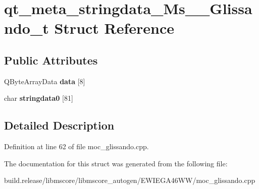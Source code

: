 \hypertarget{structqt__meta__stringdata___ms_____glissando__t}{}\section{qt\+\_\+meta\+\_\+stringdata\+\_\+\+Ms\+\_\+\+\_\+\+Glissando\+\_\+t Struct Reference}
\label{structqt__meta__stringdata___ms_____glissando__t}
\subsection*{Public Attributes}
\begin{DoxyCompactItemize}
\item 
\mbox{\label{structqt__meta__stringdata___ms_____glissando__t_aece126b9b0f7a8a24e681edcefffd4ab}} 
Q\+Byte\+Array\+Data {\bfseries data} \mbox{[}8\mbox{]}
\item 
\mbox{\label{structqt__meta__stringdata___ms_____glissando__t_a47abea427aa3d69e00af2eddec73b6c2}} 
char {\bfseries stringdata0} \mbox{[}81\mbox{]}
\end{DoxyCompactItemize}


\subsection{Detailed Description}


Definition at line 62 of file moc\+\_\+glissando.\+cpp.



The documentation for this struct was generated from the following file\+:\begin{DoxyCompactItemize}
\item 
build.\+release/libmscore/libmscore\+\_\+autogen/\+E\+W\+I\+E\+G\+A46\+W\+W/moc\+\_\+glissando.\+cpp\end{DoxyCompactItemize}
